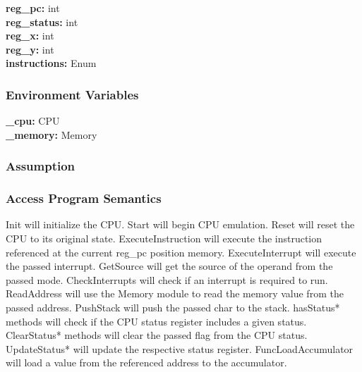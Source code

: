 \documentclass[12pt]{article}
\begin{document}
			\textbf{reg\_pc: } int\\

			\textbf{reg\_status: } int\\

			\textbf{reg\_x: } int\\

			\textbf{reg\_y: } int\\

			\textbf{instructions: } Enum\\
		\subsubsection{Environment Variables}
			\textbf{\_cpu: } CPU\\

			\textbf{\_memory: } Memory\\
		\subsubsection{Assumption}

		\subsubsection{Access Program Semantics}
			Init will initialize the CPU. Start will begin CPU emulation. Reset will reset the CPU to its original state. ExecuteInstruction will execute the instruction referenced at the current reg\_pc position memory. ExecuteInterrupt will execute the passed interrupt. GetSource will get the source of the operand from the passed mode. CheckInterrupts will check if an interrupt is required to run. ReadAddress will use the Memory module to read the memory value from the passed address. PushStack will push the passed char to the stack. hasStatus* methods will check if the CPU status register includes a given status. ClearStatus* methods will clear the passed flag from the CPU status. UpdateStatus* will update the respective status register. FuncLoadAccumulator will load a value from the referenced address to the accumulator.
\begin{versionhistory}
\end{versionhistory}
\end{document}
